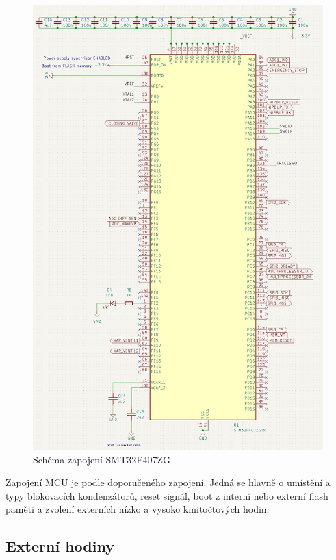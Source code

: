 \begin{figure}[H]
    \centering
    \includegraphics[width=1\linewidth]{pictures/stm_connection.jpg}
    \caption{Schéma zapojení SMT32F407ZG}
    \label{fig:stm32_conection}
\end{figure}

Zapojení MCU je podle doporučeného zapojení. Jedná se hlavně o umístění a typy blokovacích kondenzátorů, reset signál, boot z interní nebo externí flash paměti a zvolení externích nízko a vysoko kmitočtových hodin. \par

\subsection{Externí hodiny}

